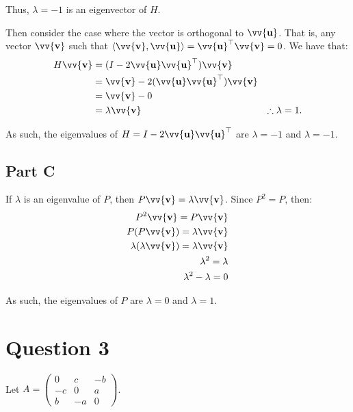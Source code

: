\documentclass[12pt]{article}
\newcommand{\vect}[1]{\vv{\mathbf{#1}}}
\begin{document}
Thus, $\lambda=-1$ is an eigenvector of $H$.

Then consider the case where the vector is orthogonal to $\vect{u}$. That is, any vector $\vect{v}$ such that $\langle\vect{v},\vect{u}\rangle = \vect{u}^\top\vect{v} = 0$. We have that:
\begin{align*}
    H\vect{v} &= (I-2\vect{u}\vect{u}^\top)\vect{v} \\
    &= \vect{v} - 2(\vect{u}\vect{u}^\top)\vect{v} \\
    &= \vect{v} - 0 \\
    &= \lambda\vect{v} &\therefore\lambda=1.
\end{align*}

As such, the eigenvalues of $H=I-2\vect{u}\vect{u}^\top$ are $\lambda=-1$ and $\lambda=-1$.

\subsection*{Part C}

If $\lambda$ is an eigenvalue of $P$, then $P\vect{v}=\lambda\vect{v}$. Since $P^2=P$, then:
\begin{align*}
    P^2\vect{v} = P\vect{v} \\
    P(P\vect{v}) = \lambda\vect{v} \\
    \lambda(\lambda\vect{v}) = \lambda\vect{v} \\
    \lambda^2 = \lambda \\
    \lambda^2-\lambda = 0
\end{align*}

As such, the eigenvalues of $P$ are $\lambda=0$ and $\lambda=1$.

\section*{Question 3}

Let $A = \begin{pmatrix} 0 & c & -b \\ -c & 0 & a \\ b & -a & 0 \end{pmatrix}$.
\end{document}
